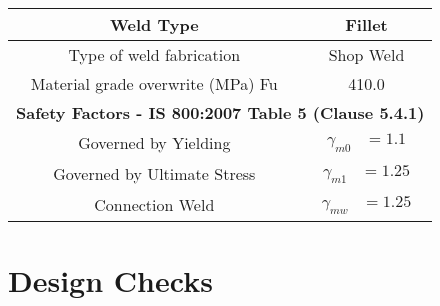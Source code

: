 \documentclass{article}%
\begin{document}
\begin{longtable}{|p{5cm}|p{2cm}|p{2cm}|p{2cm}|p{5cm}|}
\hline%
\hline%
\multicolumn{3}{|c|}{Weld Type}&\multicolumn{2}{|c|}{Fillet}\\%
\hline%
\hline%
\multicolumn{3}{|c|}{Type of weld fabrication}&\multicolumn{2}{|c|}{Shop Weld}\\%
\hline%
\hline%
\multicolumn{3}{|c|}{Material grade overwrite (MPa) Fu}&\multicolumn{2}{|c|}{410.0}\\%
\hline%
\hline%
\multicolumn{5}{|c|}{\textbf{Safety Factors {-} IS 800:2007 Table 5 (Clause 5.4.1) }}\\%
\hline%
\hline%
\multicolumn{3}{|c|}{Governed by Yielding}&\multicolumn{2}{|c|}{$\begin{aligned}\gamma_{m0}&=1.1\end{aligned}$}\\%
\hline%
\hline%
\multicolumn{3}{|c|}{Governed by Ultimate Stress}&\multicolumn{2}{|c|}{$\begin{aligned}\gamma_{m1}&=1.25\end{aligned}$}\\%
\hline%
\hline%
\multicolumn{3}{|c|}{Connection Weld}&\multicolumn{2}{|c|}{$\begin{aligned}\gamma_{mw}&=1.25\end{aligned}$}\\%
\hline%
\end{longtable}

%
%
\newpage%
\section{Design Checks}%
\label{sec:DesignChecks}%
\end{document}
